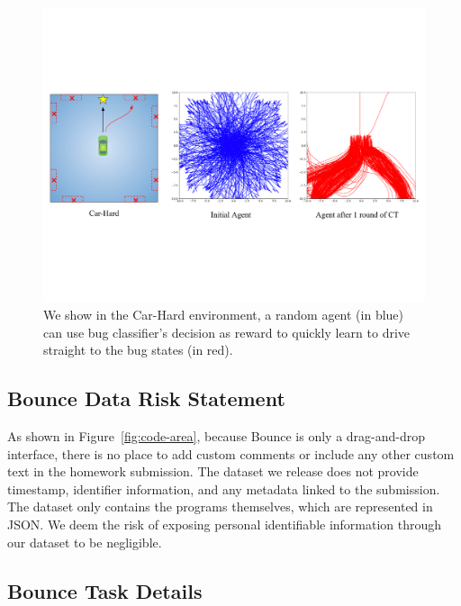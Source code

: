 \documentclass{article}
\begin{document}
\begin{figure}[ht]
    \centering
    \includegraphics[width=\linewidth]{images/ct_trajectory.pdf}
    \caption{We show in the Car-Hard environment, a random agent (in blue) can use bug classifier's decision as reward to quickly learn to drive straight to the bug states (in red).}
    \label{fig:ct_trajectory}
\end{figure}





\subsection{Bounce Data Risk Statement}
\label{sec:data-security}

As shown in Figure~\ref{fig:code-area}, because Bounce is only a drag-and-drop interface, there is no place to add custom comments or include any other custom text in the homework submission. The dataset we release does not provide timestamp, identifier information, and any metadata linked to the submission. The dataset only contains the programs themselves, which are represented in JSON. We deem the risk of exposing personal identifiable information through our dataset to be negligible.

\subsection{Bounce Task Details}
\end{document}
